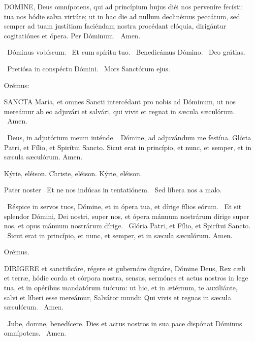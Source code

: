 \lettrine[lines=2]{D}{OMINE}, Deus omnípotens, qui ad princípium hujus diéi nos perveníre fecísti: tua nos hódie salva virtúte; ut in hac die ad nullum declinémus peccátum, sed semper ad tuam justítiam faciéndam nostra procédant elóquia, dirigántur cogitatiónes et ópera. Per Dóminum. \R\ Amen.

\V\ Dóminus vobíscum. \R\ Et cum spíritu tuo. \V\ Benedicámus Dómino. \R\ Deo grátias.


\V\ Pretiósa in conspéctu Dómini. \R\ Mors Sanctórum ejus.

 Orémus:


\lettrine[lines=2]{S}{ANCTA} María, et omnes Sancti intercédant pro nobis ad Dóminum, ut nos mereámur ab eo adjuvári et salvári, qui vivit et regnat in sæcula sæculórum. \R\ Amen.

\V\ Deus, in adjutórium meum inténde. \R\ Dómine, ad adjuvándum me festína.  Glória Patri, et Fílio, et Spirítui Sancto. Sicut erat in princípio, et nunc, et semper, et in sæcula sæculórum. Amen.

Kýrie, eléison. Christe, eléison. Kýrie, eléison.

Pater noster  \V\ Et ne nos indúcas in tentatiónem. \R\ Sed líbera nos a malo.

\V\ Réspice in servos tuos, Dómine, et in ópera tua, et dírige fílios eórum. \R\ Et sit splendor Dómini, Dei nostri, super nos, et ópera mánuum nostrárum dírige super nos, et opus mánuum nostrárum dírige. \V\ Glória Patri, et Fílio, et Spirítui Sancto. \R\ Sicut erat in princípio, et nunc, et semper, et in sæcula sæculórum. Amen.

Orémus. 

\lettrine[lines=2]{D}{IRIGERE} et sanctificáre, régere et gubernáre dignáre, Dómine Deus, Rex cæli et terræ, hódie corda et córpora nostra, sensus, sermónes et actus nostros in lege tua, et in opéribus mandatórum tuórum: ut hic, et in ætérnum, te auxiliánte, salvi et líberi esse mereámur, Salvátor mundi: Qui vivis et regnas in sæcula sæculórum. \R\ Amen.


\V\ Jube, domne, benedícere.  Dies et actus nostros in sua pace dispónat Dóminus omnípotens. \R\ Amen.

